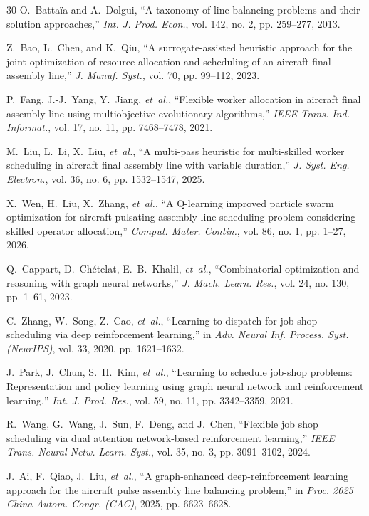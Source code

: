 \documentclass[journal,10pt]{IEEEtran}
\begin{document}
\begin{thebibliography}{30}
O.~Batta\"ia and A.~Dolgui, ``A taxonomy of line balancing problems and their solution approaches,'' \textit{Int. J. Prod. Econ.}, vol. 142, no. 2, pp. 259--277, 2013.

Z.~Bao, L.~Chen, and K.~Qiu, ``A surrogate-assisted heuristic approach for the joint optimization of resource allocation and scheduling of an aircraft final assembly line,'' \textit{J. Manuf. Syst.}, vol. 70, pp. 99--112, 2023.

P.~Fang, J.-J.~Yang, Y.~Jiang, \textit{et~al.}, ``Flexible worker allocation in aircraft final assembly line using multiobjective evolutionary algorithms,'' \textit{IEEE Trans. Ind. Informat.}, vol. 17, no. 11, pp. 7468--7478, 2021.

M.~Liu, L.~Li, X.~Liu, \textit{et~al.}, ``A multi-pass heuristic for multi-skilled worker scheduling in aircraft final assembly line with variable duration,'' \textit{J. Syst. Eng. Electron.}, vol. 36, no. 6, pp. 1532--1547, 2025.

X.~Wen, H.~Liu, X.~Zhang, \textit{et~al.}, ``A Q-learning improved particle swarm optimization for aircraft pulsating assembly line scheduling problem considering skilled operator allocation,'' \textit{Comput. Mater. Contin.}, vol. 86, no. 1, pp. 1--27, 2026.

Q.~Cappart, D.~Ch\'etelat, E.~B.~Khalil, \textit{et~al.}, ``Combinatorial optimization and reasoning with graph neural networks,'' \textit{J. Mach. Learn. Res.}, vol. 24, no. 130, pp. 1--61, 2023.

C.~Zhang, W.~Song, Z.~Cao, \textit{et~al.}, ``Learning to dispatch for job shop scheduling via deep reinforcement learning,'' in \textit{Adv. Neural Inf. Process. Syst. (NeurIPS)}, vol. 33, 2020, pp. 1621--1632.

J.~Park, J.~Chun, S.~H.~Kim, \textit{et~al.}, ``Learning to schedule job-shop problems: Representation and policy learning using graph neural network and reinforcement learning,'' \textit{Int. J. Prod. Res.}, vol. 59, no. 11, pp. 3342--3359, 2021.

R.~Wang, G.~Wang, J.~Sun, F.~Deng, and J.~Chen, ``Flexible job shop scheduling via dual attention network-based reinforcement learning,'' \textit{IEEE Trans. Neural Netw. Learn. Syst.}, vol. 35, no. 3, pp. 3091--3102, 2024.

J.~Ai, F.~Qiao, J.~Liu, \textit{et~al.}, ``A graph-enhanced deep-reinforcement learning approach for the aircraft pulse assembly line balancing problem,'' in \textit{Proc. 2025 China Autom. Congr. (CAC)}, 2025, pp. 6623--6628.


\end{thebibliography}
\end{document}

